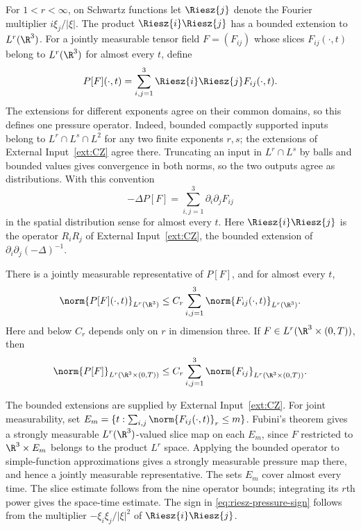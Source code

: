 \documentclass[11pt,reqno]{amsart}
\begin{document}
\begin{definition}\label{def:riesz-pressure}
For $1<r<\infty$, on Schwartz functions let $\Riesz{j}$ denote the Fourier
multiplier $i\xi_j/|\xi|$. The product $\Riesz{i}\Riesz{j}$ has a bounded
extension to $L^r(\R^3)$. For a jointly measurable tensor field $F=(F_{ij})$
whose slices $F_{ij}(\cdot,t)$ belong to $L^r(\R^3)$ for almost every $t$,
define
\begin{equation}\label{eq:riesz-pressure}
P[F](\cdot,t)=\sum_{i,j=1}^3 \Riesz{i}\Riesz{j}F_{ij}(\cdot,t).
\end{equation}
The extensions for different exponents agree on their common domains, so this
defines one pressure operator. Indeed, bounded compactly supported inputs
belong to $L^r\cap L^s\cap L^2$ for any two finite exponents $r,s$; the
extensions of External Input~\ref{ext:CZ} agree there. Truncating an
input in $L^r\cap L^s$ by balls and bounded values gives convergence in both
norms, so the two outputs agree as distributions. With this convention
\begin{equation}\label{eq:riesz-pressure-sign}
-\Delta P[F]=\sum_{i,j=1}^3\partial_i\partial_jF_{ij}
\end{equation}
in the spatial distribution sense for almost every $t$. Here $\Riesz{i}\Riesz{j}$ is the operator $R_iR_j$ of
External Input~\ref{ext:CZ}, the bounded extension of
$\partial_i\partial_j(-\Delta)^{-1}$.

There is a jointly measurable representative of $P[F]$, and for almost every
$t$,
\begin{equation}\label{eq:riesz-slice-bound}
\norm{P[F](\cdot,t)}_{L^r(\R^3)}
\le C_r\sum_{i,j=1}^3\norm{F_{ij}(\cdot,t)}_{L^r(\R^3)}.
\end{equation}
Here and below $C_r$ depends only on $r$ in dimension three. If
$F\in L^r(\R^3\times(0,T))$, then
\begin{equation}\label{eq:riesz-spacetime-bound}
\norm{P[F]}_{L^r(\R^3\times(0,T))}
\le C_r\sum_{i,j=1}^3\norm{F_{ij}}_{L^r(\R^3\times(0,T))}.
\end{equation}
\end{definition}

The bounded extensions are supplied by External Input~\ref{ext:CZ}. For joint measurability, set
$E_m=\{t:\sum_{i,j}\norm{F_{ij}(\cdot,t)}_r\le m\}$.
Fubini's theorem gives a strongly measurable $L^r(\R^3)$-valued slice map on
each $E_m$, since $F$ restricted to $\R^3\times E_m$ belongs to the product
$L^r$ space. Applying the bounded operator to simple-function
approximations gives a strongly measurable pressure map there, and hence a
jointly measurable representative. The sets $E_m$ cover almost every time.
The slice estimate follows from the nine operator bounds; integrating its
$r$th power gives the space-time estimate. The sign in
\eqref{eq:riesz-pressure-sign} follows from the multiplier
$-\xi_i\xi_j/|\xi|^2$ of $\Riesz{i}\Riesz{j}$.
\end{document}
